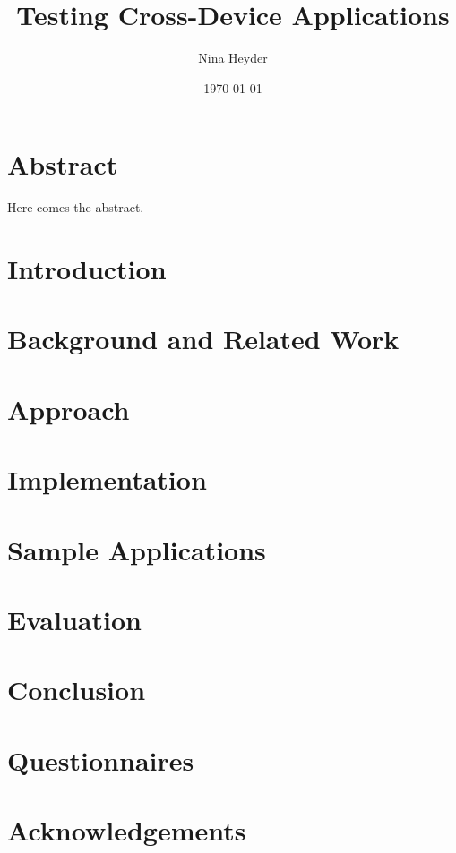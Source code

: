 \documentclass[11pt,a4paper]{globis-book}
\title{Testing Cross-Device Applications}
\author{Nina Heyder}
\institute{Institute of Information Systems}
\date{\today}
\begin{document}
\frontmatter
\maketitlepage
\cleardoublepage
{}

\chapter*{Abstract}

Here comes the abstract.

\tableofcontents

\mainmatter


\chapter{Introduction}


\chapter{Background and Related Work}


\chapter{Approach}


\chapter{Implementation}


\chapter{Sample Applications}


\chapter{Evaluation}


\chapter{Conclusion}


\appendix

\chapter{Questionnaires}

\listoffigures
\listoftables

\chapter*{Acknowledgements}

\newpage
\thispagestyle{empty}



\end{document}
